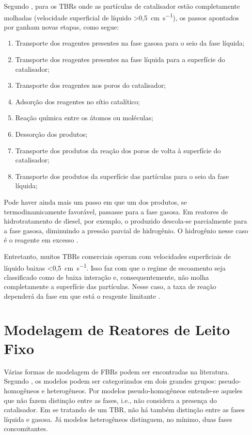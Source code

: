 Segundo , para os TBRs onde as
partículas de catalisador estão completamente molhadas (velocidade superficial
de líquido \SI{>0,5}{\centi\meter\per\s}), os passos apontados por
 ganham novas etapas, como segue:

\begin{enumerate}
\item Transporte dos reagentes presentes na fase gasosa para o seio da
fase líquida;
\item Transporte dos reagentes presentes na fase líquida para a superfície do
catalisador;
\item Transporte dos reagentes nos poros do catalisador;
\item Adsorção dos reagentes no sítio catalítico;
\item Reação química entre os átomos ou moléculas;
\item Dessorção dos produtos;
\item Transporte dos produtos da reação dos poros de volta à superfície do
catalisador;
\item Transporte dos produtos da superfície das partículas para o seio da fase
líquida;
\end{enumerate} 

Pode haver ainda mais um passo em que um dos produtos, se termodinamicamente
favorável, passasse para a fase gasosa. Em reatores de hidrotratamento de
diesel, por exemplo, o  produzido descola-se parcialmente para a fase
gasosa, diminuindo a pressão parcial de hidrogênio. O hidrogênio nesse caso é
o reagente em excesso \cite{Ancheyta2011}.

Entretanto, muitos TBRs comerciais operam com velocidades superficiais de
líquido baixas \SI{<0,5}{\centi\meter\per\s}. Isso faz com que o regime de
escoamento seja classificado como de baixa interação e, consequentemente, não molha
completamente a superfície das partículas. Nesse caso, a taxa de reação
dependerá da fase em que está o reagente limitante \cite{Ranade2011}.

\section {Modelagem de Reatores de Leito Fixo} \label{sec:modelagemreatores}

Várias formas de modelagem de FBRs podem ser encontradas na literatura.
Segundo , os modelos podem ser categorizados em dois
grandes grupos: pseudo-homogêneos e heterogêneos. Por modelos
pseudo-homogêneos entende-se aqueles que não fazem distinção entre as fases,
i.e., não considera a presença do catalisador. Em se tratando de um TBR, não há
também distinção entre as fases líquida e gasosa. Já modelos heterogêneos
distinguem, no mínimo, duas fases concomitantes.

